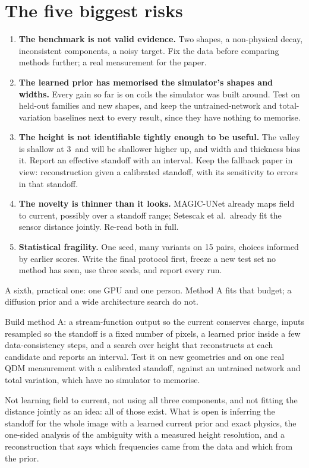 \section{The five biggest risks}

\begin{enumerate}
\item \textbf{The benchmark is not valid evidence.} Two shapes, a non-physical decay, inconsistent components, a noisy
target. Fix the data before comparing methods further; a real measurement for the paper.
\item \textbf{The learned prior has memorised the simulator's shapes and widths.} Every gain so far is on coils the
simulator was built around. Test on held-out families and new shapes, and keep the untrained-network and total-variation
baselines next to every result, since they have nothing to memorise.
\item \textbf{The height is not identifiable tightly enough to be useful.} The valley is shallow at 3\um\ and will be
shallower higher up, and width and thickness bias it. Report an effective standoff with an interval. Keep the fallback
paper in view: reconstruction given a calibrated standoff, with its sensitivity to errors in that standoff.
\item \textbf{The novelty is thinner than it looks.} MAGIC-UNet already maps field to current, possibly over a standoff
range; Setescak et al.\ already fit the sensor distance jointly. Re-read both in full.
\item \textbf{Statistical fragility.} One seed, many variants on 15 pairs, choices informed by earlier scores. Write the final
protocol first, freeze a new test set no method has seen, use three seeds, and report every run.
\end{enumerate}

A sixth, practical one: one GPU and one person. Method A fits that budget; a diffusion prior and a wide architecture
search do not.

\begin{defend}
Build method A: a stream-function output so the current conserves charge, inputs resampled so the standoff is a fixed
number of pixels, a learned prior inside a few data-consistency steps, and a search over height that reconstructs at
each candidate and reports an interval. Test it on new geometries and on one real QDM measurement with a calibrated
standoff, against an untrained network and total variation, which have no simulator to memorise.
\end{defend}

\begin{defend}
Not learning field to current, not using all three components, and not fitting the distance jointly as an idea: all of
those exist. What is open is inferring the standoff for the whole image with a learned current prior and exact physics,
the one-sided analysis of the ambiguity with a measured height resolution, and a reconstruction that says which
frequencies came from the data and which from the prior.
\end{defend}
